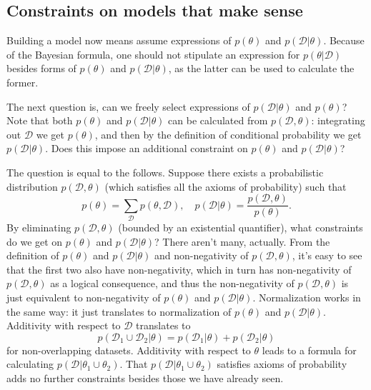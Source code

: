 \documentclass[hyperref, a4paper]{article}
\begin{document}
\subsection{Constraints on models that make sense}\label{sec:constraints}

Building a model now means assume expressions of $p(\theta)$ and $p(\mathcal{D} | \theta)$.
Because of the Bayesian formula,
one should not stipulate an expression for $p(\theta | \mathcal{D})$
besides forms of $p(\theta)$ and $p(\mathcal{D} | \theta)$,
as the latter can be used to calculate the former.

The next question is, can we freely select expressions of $p(\mathcal{D} | \theta)$ and $p(\theta)$?
Note that both $p(\theta)$ and $p(\mathcal{D} | \theta)$ can be calculated from $p(\mathcal{D}, \theta)$:
integrating out $\mathcal{D}$ we get $p(\theta)$,
and then by the definition of conditional probability we get $p(\mathcal{D} | \theta)$.
Does this impose an additional constraint on $p(\theta)$ and $p(\mathcal{D} | \theta)$?

The question is equal to the follows.
Suppose there exists a probabilistic distribution $p(\mathcal{D}, \theta)$
(which satisfies all the axioms of probability) such that 
\begin{equation}
    p(\theta) = \sum_{\mathcal{D}} p(\theta, \mathcal{D}), \quad p(\mathcal{D} | \theta) = \frac{p(\mathcal{D}, \theta)}{p(\theta)}.
\end{equation}
By eliminating $p(\mathcal{D}, \theta)$ (bounded by an existential quantifier),
what constraints do we get on $p(\theta)$ and $p(\mathcal{D} | \theta)$?
There aren't many, actually. From the definition of $p(\theta)$ and $p(\mathcal{D} | \theta)$
and non-negativity of $p(\mathcal{D}, \theta)$,
it's easy to see that the first two also have non-negativity,
which in turn has non-negativity of $p(\mathcal{D}, \theta)$ as a logical consequence,
and thus the non-negativity of $p(\mathcal{D}, \theta)$
is just equivalent to non-negativity of $p(\theta)$ and $p(\mathcal{D} | \theta)$.
Normalization works in the same way: it just translates to normalization of $p(\theta)$ and $p(\mathcal{D} | \theta)$.
Additivity with respect to $\mathcal{D}$ translates to 
\begin{equation}
    p(\mathcal{D}_1 \cup \mathcal{D}_2 | \theta) = p(\mathcal{D}_1 | \theta) + p(\mathcal{D}_2 | \theta)
    \label{eq:additivity}
\end{equation}
for non-overlapping datasets.
Additivity with respect to $\theta$ leads to a formula for calculating $p(\mathcal{D} | \theta_1 \cup \theta_2)$.
That $p(\mathcal{D} | \theta_1 \cup \theta_2)$ satisfies axioms of probability adds no further constraints besides those we have already seen.
\end{document}
